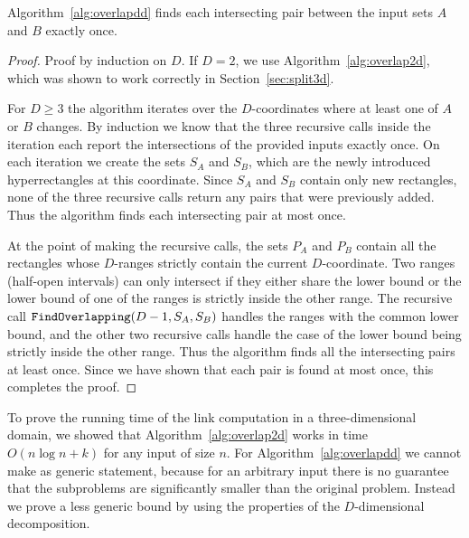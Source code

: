 \documentclass[english,gradu]{tktltiki2018}
\begin{document}
\begin{lem}\label{lem:overlapddok}
Algorithm~\ref{alg:overlapdd} finds each intersecting pair between the input sets $A$ and $B$ exactly once.
\end{lem}
\begin{proof}
Proof by induction on $D$.
If $D=2$, we use Algorithm~\ref{alg:overlap2d}, which was shown to work correctly in Section~\ref{sec:split3d}.

For $D\ge 3$ the algorithm iterates over the $D$-coordinates where at least one of $A$ or $B$ changes.
By induction we know that the three recursive calls inside the iteration each report the intersections of the provided inputs exactly once.
On each iteration we create the sets $S_A$ and $S_B$, which are the newly introduced hyperrectangles at this coordinate.
Since $S_A$ and $S_B$ contain only new rectangles, none of the three recursive calls return any pairs that were previously added.
Thus the algorithm finds each intersecting pair at most once.

At the point of making the recursive calls, the sets $P_A$ and $P_B$ contain all the rectangles whose $D$-ranges strictly contain the current $D$-coordinate.
Two ranges (half-open intervals) can only intersect if they either share the lower bound or the lower bound of one of the ranges is strictly inside the other range.
The recursive call $\texttt{FindOverlapping}(D-1,S_A,S_B)$ handles the ranges with the common lower bound, and the other two recursive calls handle the case of the lower bound being strictly inside the other range.
Thus the algorithm finds all the intersecting pairs at least once.
Since we have shown that each pair is found at most once, this completes the proof.
\end{proof}

To prove the running time of the link computation in a three-dimensional domain, we showed that Algorithm~\ref{alg:overlap2d} works in time $O(n\log n+k)$ for any input of size $n$.
For Algorithm~\ref{alg:overlapdd} we cannot make as generic statement, because for an arbitrary input there is no guarantee that the subproblems are significantly smaller than the original problem.
Instead we prove a less generic bound by using the properties of the $D$-dimensional decomposition.
\end{document}
